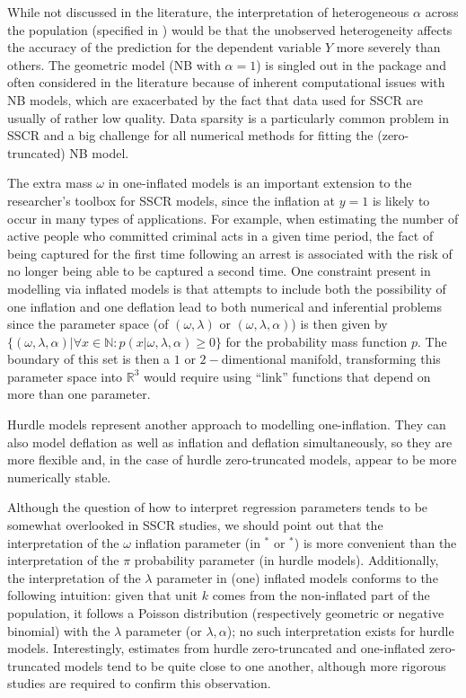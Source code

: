 \documentclass[nojss]{jss}
\newcommand{\1}{\mathcal{I}} \newcommand{\bZero}{\boldsymbol{0}}
\begin{document}
While not discussed in the literature, the interpretation of
heterogeneous \(\alpha\) across the population (specified in
) would be that the unobserved heterogeneity affects
the accuracy of the prediction for the dependent variable \(Y\) more
severely than others. The geometric model (NB with \(\alpha=1\)) is
singled out in the package and often considered in the literature
because of inherent computational issues with NB models, which are
exacerbated by the fact that data used for SSCR are usually of rather
low quality. Data sparsity is a particularly common problem in SSCR and
a big challenge for all numerical methods for fitting the
(zero-truncated) NB model.

The extra mass \(\omega\) in one-inflated models is an important
extension to the researcher's toolbox for SSCR models, since the
inflation at \(y=1\) is likely to occur in many types of applications.
For example, when estimating the number of active people who committed
criminal acts in a given time period, the fact of being captured for the
first time following an arrest is associated with the risk of no longer
being able to be captured a second time. One constraint present in
modelling via inflated models is that attempts to include both the
possibility of one inflation and one deflation lead to both numerical
and inferential problems since the parameter space (of
\((\omega, \lambda)\) or \((\omega, \lambda, \alpha)\)) is then given by
\(\{(\omega, \lambda, \alpha) | \forall x\in \mathbb{N}: p(x|\omega, \lambda, \alpha)\geq0\}\)
for the probability mass function \(p\). The boundary of this set is
then a \(1\) or \(2-\)dimentional manifold, transforming this parameter
space into \(\mathbb{R}^{3}\) would require using ``link'' functions
that depend on more than one parameter.

Hurdle models represent another approach to modelling one-inflation.
They can also model deflation as well as inflation and deflation
simultaneously, so they are more flexible and, in the case of hurdle
zero-truncated models, appear to be more numerically stable.

Although the question of how to interpret regression parameters tends to
be somewhat overlooked in SSCR studies, we should point out that the
interpretation of the \(\omega\) inflation parameter (in
\(^\ast\) or \(^\ast\)) is more convenient than
the interpretation of the \(\pi\) probability parameter (in hurdle
models). Additionally, the interpretation of the \(\lambda\) parameter
in (one) inflated models conforms to the following intuition: given that
unit \(k\) comes from the non-inflated part of the population, it
follows a Poisson distribution (respectively geometric or negative
binomial) with the \(\lambda\) parameter (or \(\lambda,\alpha\)); no
such interpretation exists for hurdle models. Interestingly, estimates
from hurdle zero-truncated and one-inflated zero-truncated models tend
to be quite close to one another, although more rigorous studies are
required to confirm this observation.
\end{document}
